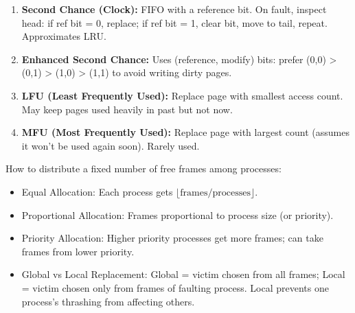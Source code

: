 \documentclass[11pt]{article}
\newcommand{\cle}[1]{{\popxbold\color{popdark}#1}}
\begin{document}
\begin{methode}
\begin{enumerate}
\item \textbf{Second Chance (Clock):} FIFO with a reference bit. On fault, inspect head: if ref bit = 0, replace; if ref bit = 1, clear bit, move to tail, repeat. Approximates LRU.
\item \textbf{Enhanced Second Chance:} Uses (reference, modify) bits: prefer (0,0) > (0,1) > (1,0) > (1,1) to avoid writing dirty pages.
\item \textbf{LFU (Least Frequently Used):} Replace page with smallest access count. May keep pages used heavily in past but not now.
\item \textbf{MFU (Most Frequently Used):} Replace page with largest count (assumes it won't be used again soon). Rarely used.
\end{enumerate}
\end{methode}

\begin{propriete}
How to distribute a fixed number of free frames among processes:
\begin{itemize}
\item \cle{Equal Allocation}: Each process gets $\lfloor \text{frames} / \text{processes} \rfloor$.
\item \cle{Proportional Allocation}: Frames proportional to process size (or priority).
\item \cle{Priority Allocation}: Higher priority processes get more frames; can take frames from lower priority.
\item \cle{Global vs Local Replacement}: Global = victim chosen from all frames; Local = victim chosen only from frames of faulting process. Local prevents one process's thrashing from affecting others.
\end{itemize}
\end{propriete}
\end{document}
